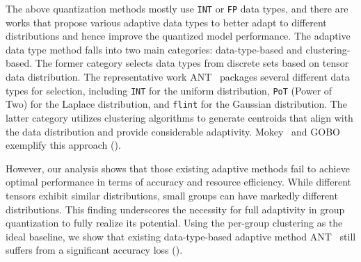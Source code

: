 The above quantization methods mostly use \texttt{INT} or \texttt{FP} data types, and there are works that propose various adaptive data types to better adapt to different distributions and hence improve the quantized model performance.
The adaptive data type method falls into two main categories: data-type-based and clustering-based.
The former category selects data types from discrete sets based on tensor data distribution.
The representative work ANT~\cite{guo2022ant} packages several different data types for selection, including \texttt{INT} for the uniform distribution, \texttt{PoT} (Power of Two) for the Laplace distribution, and \texttt{flint} for the Gaussian distribution.
The latter category utilizes clustering algorithms to generate centroids that align with the data distribution and provide considerable adaptivity. 
Mokey~\cite{zadeh2022mokey} and GOBO~\cite{zadeh2020gobo} exemplify this approach ().
 


However, our analysis shows that those existing adaptive methods fail to achieve optimal performance in terms of accuracy and resource efficiency.
While different tensors exhibit similar distributions, small groups can have markedly different distributions. 
This finding underscores the necessity for full adaptivity in group quantization to fully realize its potential.
Using the per-group clustering as the ideal baseline, we show that existing data-type-based adaptive method ANT~\cite{guo2022ant} still suffers from a significant accuracy loss ().


